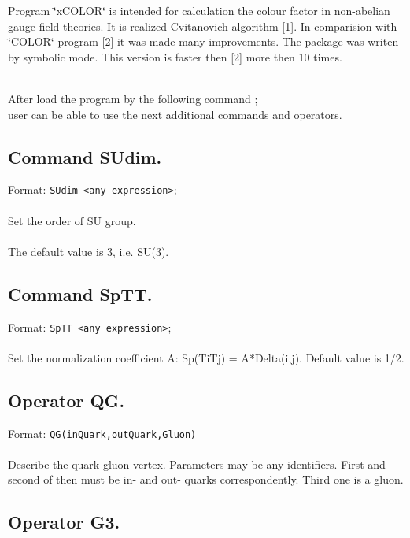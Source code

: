 
Program \char`\"{}xCOLOR\char`\"{} is intended for calculation the colour
factor in non-abelian gauge field theories. It is 
realized Cvitanovich algorithm {[}1{]}. In comparision with
\char`\"{}COLOR\char`\"{} program {[}2{]} it was made many improvements.
The package was writen by symbolic mode. This version is
faster then {[}2{]} more then 10 times.

\ \\
After load the program by the following command ; \\
user can be able to use the next additional commands and operators. 

\subsection*{Command SUdim.}

Format: {\tt SUdim <any expression>}; \\
\ \\
Set the order of SU group. \\
\ \\
The default value is 3, i.e. SU(3). 

\subsection*{Command SpTT.}

Format: {\tt SpTT <any expression>}; \\
\ \\
Set the normalization coefficient A: Sp(TiTj) = A{*}Delta(i,j).
Default value is 1/2. 

\subsection*{Operator QG.}

Format: {\tt QG(inQuark,outQuark,Gluon)} \\
\ \\
Describe the quark-gluon vertex. Parameters may be any identifiers.
First and second of then must be in- and out- quarks correspondently.
Third one is a gluon. 

\subsection*{Operator G3.}

